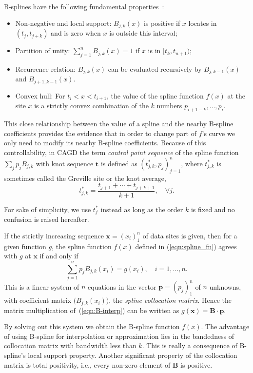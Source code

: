 \documentclass{sig-alternate}
\newcommand{\vectort}{\mathbf{t}}
\newcommand{\vectorx}{\mathbf{x}}
\newcommand{\matrixB}{\mathbf{B}}
\newcommand{\vectorp}{\mathbf{p}}
\begin{document}
B-splines have the following fundamental properties~\cite{PGS}: 
\begin{itemize} \itemsep -0.5ex
\item Non-negative and local support: $B_{j,k}(x)$ is positive if
$x$ locates in $(t_j,t_{j+k})$ and is zero when $x$ is outside this
interval;  
\item Partition of unity: $\sum_{j=1}^n B_{j,k}(x)=1$ if
$x$ is in $[t_k,t_{n+1})$; 
\item Recurrence relation: $B_{j,k}(x)$ can be evaluated recursively
by $B_{j,k-1}(x)$ and $B_{j+1,k-1}(x)$. 
\item Convex hull: For $t_i<x<t_{i+1}$, the value of the spline
function $f(x)$ at the site $x$ is a strictly convex combination of
the $k$ numbers $p_{i+1-k},\ldots,p_i$.
\end{itemize}

This close relationship between the value of a spline and the
nearby B-spline coefficients provides the evidence that in order to
change part of $f$'s curve we only need to modify its nearby B-spline
coefficients. Because of this controllability, in CAGD the term
\emph{control point sequence} of the spline function 
$\sum_j{p_j B_{j,k}}$ with knot sequence $\vectort$ is defined as
$(t_{j,k}^*,p_j)_{j=1}^n$, where $t_{j,k}^*$ is sometimes called the
Greville site or the knot average,
\begin{equation}\label{eqn:aveknt}
t_{j,k}^*=\frac{t_{j+1}+\cdots+t_{j+k+1}}{k+1},\quad \forall j.
\end{equation}

For sake of simplicity, we use $t_j^*$ instead as long as the order
$k$ is fixed and no confusion is raised hereafter.

If the strictly increasing sequence $\vectorx = (x_i)_1^n$ of
data sites is given, then for a given function $g$, the spline function 
$f(x)$ defined in (\ref{eqn:spline_fn}) agrees with $g$ at $\vectorx$
if and only if  
\begin{equation}\label{eqn:B-interp}
\sum_{j=1}^n{p_j B_{j,k}(x_i)=g(x_i)},\quad i=1,\ldots,n.
\end{equation}
This is a linear system of $n$ equations in the vector 
$\vectorp=(p_j)_1^n$ of $n$ unknowns, with coefficient matrix 
$\big(B_{j,k}(x_i)\big)$, the \emph{spline collocation  matrix}. Hence
the matrix multiplication of~(\ref{eqn:B-interp})
can be written as $g(\vectorx) = \matrixB\cdot \vectorp$.

By solving out this system we obtain the B-spline
function $f(x)$. The advantage of using B-spline for interpolation or
approximation lies in the bandedness of
collocation matrix with bandwidth less than $k$. This is really a
consequence of B-spline's local support property. Another significant
property of the collocation matrix is total positivity, i.e., every
non-zero element of $\matrixB$ is positive. 
\end{document}
